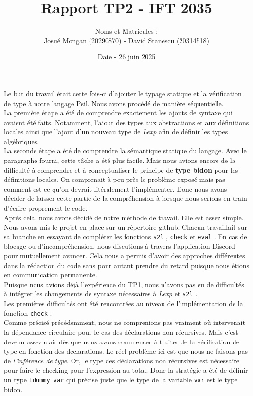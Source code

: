 \documentclass[11pt]{article}
\title{Rapport TP2 - IFT 2035}
\author{ Noms et Matricules : \vspace{0.2cm}\\
	Josué Mongan (20290870) - David Stanescu (20314518)}
\date{Date - 26 juin 2025}
\newcommand{\eval}{\texttt{eval} }
\newcommand{\ch}{\texttt{check} }
\newcommand{\stol}{\texttt{s2l} }
\newcommand{\lexp}{\textit{Lexp} }
\begin{document}
	\maketitle	
	\pagebreak
	
	Le but du travail était cette fois-ci d'ajouter le typage statique et la vérification de type à notre langage Psil. Nous avons procédé de manière séquentielle.\\
	
	La première étape a été de comprendre exactement les ajouts de syntaxe qui avaient été faits. Notamment, l'ajout des types aux abstractions et aux définitions locales ainsi que l'ajout d'un nouveau type de \lexp afin de définir les types algébriques.\\
	
	La seconde étape a été de comprendre la sémantique statique du langage. Avec le paragraphe fourni, cette tâche a été plus facile. Mais nous avions encore de la difficulté à comprendre et à conceptualiser le principe de \textbf{type bidon}  pour les définitions locales. On comprenait à peu près le problème exposé mais pas comment est ce qu'on devrait litéralement l'implémenter. Donc nous avons décider de laisser cette partie de la compréhension à lorsque nous serions en train d'écrire proprement le code.\\
	
	Après cela, nous avons décidé de notre méthode de travail. Elle est assez simple. Nous avons mis le projet en place sur un répertoire github. Chacun travaillait sur sa branche en essayant de compléter les fonctions \stol, \ch et \eval. En cas de blocage ou d'incompréhension, nous discutions à travers l'application Discord pour mutuellement avancer. Cela nous a permis d'avoir des approches différentes dans la rédaction du code sans pour autant prendre du retard puisque nous étions en communication permanente.\\
	
	Puisque nous avions déjà l'expérience du TP1, nous n'avons pas eu de difficultés à intégrer les changements de syntaxe nécessaires à \lexp et \stol.\\
	
	Les premières difficultés ont été rencontrées au niveau de l'implémentation de la fonction \ch.\\
	
	Comme précisé précédemment, nous ne comprenions pas vraiment où intervenait la dépendance circulaire pour le cas des déclarations non récursives. Mais c'est devenu assez clair dès que nous avons commencer à traiter de la vérification de type en fonction des déclarations. Le réel problème ici est que nous ne faisons pas de \textit{l'inférence de type}. Or, le type des déclarations non récursives est nécessaire pour faire le checking pour l'expression au total. Donc la stratégie a été de définir un type \texttt{Ldummy var} qui précise juste que le type de la variable \texttt{var} est le type bidon.\\
	
\end{document}
